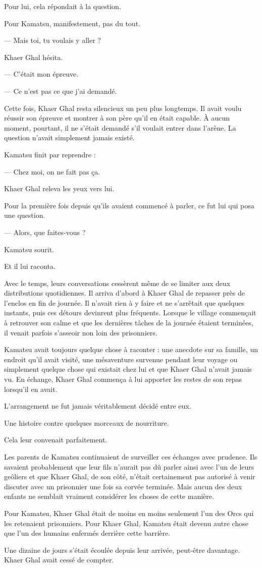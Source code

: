 Pour lui, cela répondait à la question.

Pour Kamatsu, manifestement, pas du tout.

— Mais toi, tu voulais y aller ?

Khaer Ghal hésita.

— C'était mon épreuve.

— Ce n'est pas ce que j'ai demandé.

Cette fois, Khaer Ghal resta silencieux un peu plus longtemps. Il avait voulu
réussir son épreuve et montrer à son père qu'il en était capable. À aucun
moment, pourtant, il ne s'était demandé s'il voulait entrer dans l'arène. La
question n'avait simplement jamais existé.

Kamatsu finit par reprendre :

— Chez moi, on ne fait pas ça.

Khaer Ghal releva les yeux vers lui.

Pour la première fois depuis qu'ils avaient commencé à parler, ce fut lui qui
posa une question.

— Alors, que faites-vous ?

Kamatsu sourit.

Et il lui raconta.

\scenebreak

Avec le temps, leurs conversations cessèrent même de se limiter aux deux
distributions quotidiennes. Il arriva d'abord à Khaer Ghal de repasser près de
l'enclos en fin de journée. Il n'avait rien à y faire et ne s'arrêtait que
quelques instants, puis ces détours devinrent plus fréquents. Lorsque le village
commençait à retrouver son calme et que les dernières tâches de la journée
étaient terminées, il venait parfois s'asseoir non loin des prisonniers.

Kamatsu avait toujours quelque chose à raconter : une anecdote sur sa famille,
un endroit qu'il avait visité, une mésaventure survenue pendant leur voyage ou
simplement quelque chose qui existait chez lui et que Khaer Ghal n'avait jamais
vu. En échange, Khaer Ghal commença à lui apporter les restes de son repas
lorsqu'il en avait.

L'arrangement ne fut jamais véritablement décidé entre eux.

Une histoire contre quelques morceaux de nourriture.

Cela leur convenait parfaitement.

Les parents de Kamatsu continuaient de surveiller ces échanges avec prudence.
Ils savaient probablement que leur fils n'aurait pas dû parler ainsi avec l'un
de leurs geôliers et que Khaer Ghal, de son côté, n'était certainement pas
autorisé à venir discuter avec un prisonnier une fois sa corvée terminée. Mais
aucun des deux enfants ne semblait vraiment considérer les choses de cette
manière.

Pour Kamatsu, Khaer Ghal était de moins en moins seulement l'un des Orcs qui
les retenaient prisonniers. Pour Khaer Ghal, Kamatsu était devenu autre chose
que l'un des humains enfermés derrière cette barrière.

Une dizaine de jours s'était écoulée depuis leur arrivée, peut-être davantage.
Khaer Ghal avait cessé de compter.